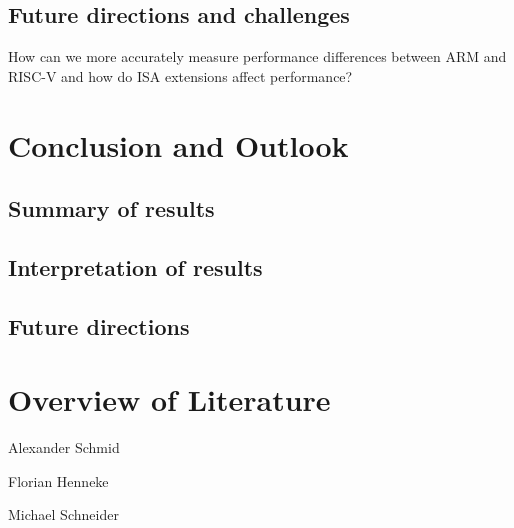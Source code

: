 \documentclass[conference]{IEEEtran}
\begin{document}
	\subsection{Future directions and challenges}
	How can we more accurately measure performance differences between ARM and RISC-V and how do ISA extensions affect performance?

\section{Conclusion and Outlook}
\label{ref:conclusion}
	\subsection{Summary of results}
	\subsection{Interpretation of results}
	\subsection{Future directions}

\section{Overview of Literature}
Alexander Schmid \cite{Akram2017} \cite{Arm2020} \cite{Asanovic2014} \cite{HeuiLee2001} \cite{Patterson2019} \cite{Perotti2020} \cite{Shore2015} \cite{Waterman2016} \cite{Xu2003}

Florian Henneke \cite{Waterman2016} \cite{Ryzhyk2006} \cite{Asanovic2014} \cite{Furber2000} \cite{Microsoft2020} \cite{Greenwaves2020} \cite{Aws2020} \cite{Microsoft2020}

Michael Schneider \cite{50years} \cite{hennessy2012computer} \cite{drechsler2020enhanced} \cite{WisconsinMadison2016} \cite{IEEE2018} \cite{Dirvin2019} \cite{Bandic2019}



\end{document}
